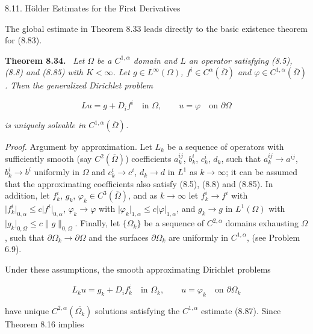 
\begin{flushleft}
8.11. Hölder Estimates for the First Derivatives
\end{flushleft}

The global estimate in Theorem 8.33 leads directly to the basic existence
theorem for (8.83).

\textbf{Theorem 8.34.} \ \emph{Let $\Omega$ be a $C^{1,\alpha}$ domain and $L$ an operator satisfying (8.5), (8.8) and (8.85) with $K < \infty$. Let $g \in L^\infty(\Omega)$, $f^i \in C^\alpha(\overline{\Omega})$ and $\varphi \in C^{1,\alpha}(\overline{\Omega})$. Then the generalized Dirichlet problem}

\begin{equation}
Lu = g + D_i f^i \quad \text{in } \Omega,\qquad u = \varphi \quad \text{on } \partial\Omega
\end{equation}

\emph{is uniquely solvable in $C^{1,\alpha}(\overline{\Omega})$.}

\emph{Proof.} Argument by approximation. Let $L_k$ be a sequence of operators with sufficiently smooth (say $C^2(\overline{\Omega})$) coefficients $a_k^{ij}$, $b_k^i$, $c_k^i$, $d_k$, such that $a_k^{ij} \to a^{ij}$, $b_k^i \to b^i$ uniformly in $\Omega$ and $c_k^i \to c^i$, $d_k \to d$ in $L^1$ as $k \to \infty$; it can be assumed that the approximating coefficients also satisfy (8.5), (8.8) and (8.85). In addition, let $f_k^i$, $g_k$, $\varphi_k \in C^3(\overline{\Omega})$, and as $k \to \infty$ let $f_k^i \to f^i$ with $\lvert f_k^i \rvert_{0,\alpha} \leq c \lvert f^i \rvert_{0,\alpha}$, $\varphi_k \to \varphi$ with $\lvert \varphi_k \rvert_{1,\alpha} \leq c \lvert \varphi \rvert_{1,\alpha}$, and $g_k \to g$ in $L^1(\Omega)$ with $\lvert g_k \rvert_{0,\Omega} \leq c \lVert g \rVert_{0,\Omega}$. Finally, let $\{\Omega_k\}$ be a sequence of $C^{2,\alpha}$ domains exhausting $\Omega$, such that $\partial\Omega_k \to \partial\Omega$ and the surfaces $\partial\Omega_k$ are uniformly in $C^{1,\alpha}$, (see Problem 6.9).

Under these assumptions, the smooth approximating Dirichlet problems

\begin{equation}
L_k u = g_k + D_i f_k^i \quad \text{in } \Omega_k,\qquad u = \varphi_k \quad \text{on } \partial\Omega_k
\end{equation}

have unique $C^{2,\alpha}(\overline{\Omega_k})$ solutions satisfying the $C^{1,\alpha}$ estimate (8.87). Since Theorem 8.16 implies

